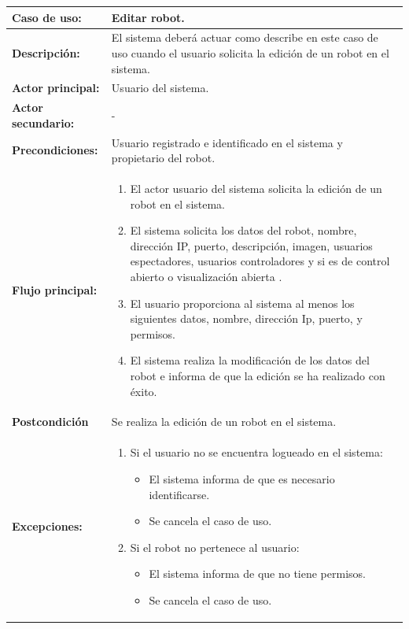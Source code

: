 \begin{table}[H]
  \begin{center}
    \begin{tabular}{|p{3.5cm}|p{10cm}|}
      \hline
      {\textbf{Caso de uso:}} & { Editar robot.} \\
      \hline
      {\textbf{Descripción:}} & { El sistema deberá actuar como describe en este caso de uso cuando el usuario solicita la edición de un robot en el sistema.} \\
     \hline
      {\textbf{Actor principal:}} & { Usuario del sistema.} \\
      \hline
      {\textbf{Actor secundario:}} & { - } \\
      \hline
      {\textbf{Precondiciones:}} & { Usuario registrado e identificado en el sistema y propietario del robot. } \\
     \hline   
    {\textbf{Flujo principal:}} & { 
      \begin{enumerate}
	\item El actor usuario del sistema solicita la edición de un robot en el sistema.
	\item El sistema solicita los datos del robot, nombre, dirección IP, puerto, descripción, imagen, usuarios espectadores, usuarios controladores y si es de control abierto o visualización abierta .
	\item El usuario proporciona al sistema al menos los siguientes datos, nombre, dirección Ip, puerto, y permisos.
	\item El sistema realiza la modificación de los datos del robot e informa de que la edición se ha realizado con éxito.
      \end{enumerate}
      } \\
     \hline
     {\textbf{Postcondición}} & {Se realiza la edición de un robot en el sistema.}\\
     \hline
         {\textbf{Excepciones:}} & {
         \begin{enumerate}
         
	  \item Si el usuario no se encuentra logueado en el sistema:
	  \begin{itemize}
	    \item El sistema informa de que es necesario identificarse.
	    \item Se cancela el caso de uso.
	  \end{itemize}
      
	  \item Si el robot no pertenece al usuario:
	  \begin{itemize}
	    \item El sistema informa de que no tiene permisos.
	    \item Se cancela el caso de uso.
	  \end{itemize}
	  

\end{enumerate}}
\end{tabular}
\end{center}
\end{table}
